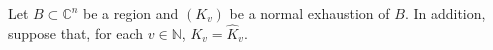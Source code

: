 Let $B \subset \mathbb{C}^n$ be a region and $(K_v)$ be a normal exhaustion of $B$. In addition, suppose that, for each $v \in \mathbb{N}$, $K_v = \hat{K}_v$.
